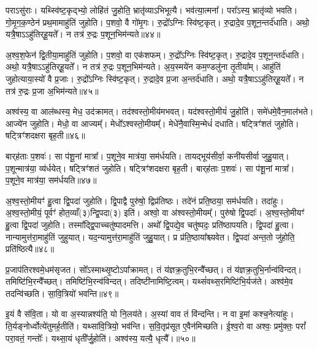 पराऽसु॑राः।
यथ्स्वि॑ष्ट॒कृद्भ्यो॒ लोहि॑तं जु॒होति॒ भ्रातृ॑व्याऽभिभूत्यै।
भव॑त्या॒त्मना᳚।
परा᳚ऽस्य॒ भ्रातृ॑व्यो भवति।
गो॒मृ॒ग॒क॒ण्ठेन॑ प्रथ॒मामाहु॑तिं जुहोति।
प॒शवो॒ वै गो॑मृ॒गः।
रु॒द्रो᳚\-ऽग्निः स्वि॑ष्ट॒कृत्।
रु॒द्रादे॒व प॒शून॒न्तर्द॑धाति।
अथो॒ यत्रै॒षा\-ऽऽहु॑तिर्‌\mbox{}हू॒यते᳚।
न तत्र॑ रु॒द्रः प॒शून॒भिम॑न्यते॥४४॥

अ॒श्व॒श॒फेन॑ द्वि॒तीया॒माहु॑तिं जुहोति।
प॒शवो॒ वा एक॑शफम्।
रु॒द्रो᳚\-ऽग्निः स्वि॑ष्ट॒कृत्।
रु॒द्रादे॒व प॒शून॒न्तर्द॑धाति।
अथो॒ यत्रै॒षा\-ऽऽहु॑तिर्‌\mbox{}हू॒यते᳚।
न तत्र॑ रु॒द्रः प॒शून॒भिम॑न्यते।
अ॒य॒स्मये॑न कम॒ण्डलु॑ना तृ॒तीया᳚म्।
आहु॑तिं जुहोत्याया॒स्यो॑ वै प्र॒जाः।
रु॒द्रो᳚\-ऽग्निः स्वि॑ष्ट॒कृत्।
रु॒द्रादे॒व प्र॒जा अ॒न्तर्द॑धाति।
अथो॒ यत्रै॒षा\-ऽऽहु॑तिर्‌\mbox{}हू॒यते᳚।
न तत्र॑ रु॒द्रः प्र॒जा अ॒भिम॑न्यते॥४५॥\anuvakamend[द॒धा॒त्यभ॑वन्मन्यते प्र॒जा अ॒न्तर्द॑धाति॒ द्वे च॑ ]

अश्व॑स्य॒ वा आल॑ब्धस्य॒ मेध॒ उद॑क्रामत्।
तद॑श्वस्तो॒मीय॑\-मभवत्।
यद॑श्वस्तो॒मीयं॑ जु॒होति॑।
समे॑धमे॒वैन॒माल॑भते।
आज्ये॑न जुहोति।
मेधो॒ वा आज्यम्᳚।
मेधो᳚\-ऽश्वस्तो॒मीयम्᳚।
मेधे॑नै॒वास्मि॒न्मेधं॑ दधाति।
षट्त्रिꣳ॑शतं जुहोति।
षट्त्रिꣳ॑शदक्षरा बृह॒ती॥४६॥

बार्‌\mbox{}ह॑ताः प॒शवः॑।
सा प॑शू॒नां मात्रा᳚।
प॒शूने॒व मात्र॑या॒ सम॑र्धयति।
तायद्भूय॑सीर्वा॒ कनी॑यसीर्वा जुहु॒यात्।
प॒शून्मात्र॑या॒ व्य॑र्धयेत्।
षट्त्रिꣳ॑शतं जुहोति।
षट्त्रिꣳ॑शदक्षरा बृह॒ती।
बार्‌\mbox{}ह॑ताः प॒शवः॑।
सा प॑शू॒नां मात्रा᳚।
प॒शूने॒व मात्र॑या॒ सम॑र्धयति॥४७॥

अ॒श्व॒स्तो॒मीयꣳ॑ हु॒त्वा द्वि॒पदा॑ जुहोति।
द्वि॒पाद्वै पुरु॑षो॒ द्विप्र॑तिष्ठः।
तदे॑नं प्रति॒ष्ठया॒ सम॑र्धयति।
तदा॑हुः।
अ॒श्व॒स्तो॒मीयं॒ पूर्वꣳ॑ होत॒व्याँ(३)न्द्वि॒पदा(३) इति॑।
अश्वो॒ वा अ॑श्वस्तो॒मीयम्᳚।
पुरु॑षो द्वि॒पदाः᳚।
अ॒श्व॒स्तो॒मीयꣳ॑ हु॒त्वा द्वि॒पदा॑ जुहोति।
तस्मा᳚द्द्वि॒पाच्चतु॑ष्पादमत्ति।
अथो᳚ द्वि॒पद्ये॒व चतु॑ष्पदः॒ प्रति॑\-ष्ठापयति।
द्वि॒पदा॑ हु॒त्वा।
नान्यामुत्त॑रा॒माहु॑तिं जुहुयात्।
यद॒न्यामुत्त॑रा॒माहु॑तिं जुहु॒यात्।
प्र प्र॑ति॒ष्ठाया᳚श्च्यवेत।
द्वि॒पदा॑ अन्त॒तो जु॑होति॒ प्रति॑\-ष्ठित्यै॥४८॥

प्र॒जाप॑तिरश्वमे॒धम॑सृजत।
सो᳚ऽस्माथ्सृ॒ष्टो\-ऽपा᳚क्रामत्।
तं य॑ज्ञक्र॒तुभि॒रन्वै᳚च्छत्।
तं य॑ज्ञक्र॒तुभि॒र्नान्व॑विन्दत्।
तमिष्टि॑भि॒रन्वै᳚च्छत्।
तमिष्टि॑भि॒रन्व॑विन्दत्।
तदिष्टी॑नामिष्टि॒\-त्वम्।
यथ्सं॑वथ्स॒रमिष्टि॑भि॒र्यज॑ते।
अश्व॑मे॒व तदन्वि॑च्छति।
सा॒वि॒त्रियो॑ भवन्ति॥४९॥

इ॒यं वै स॑वि॒ता।
यो वा अ॒स्यान्नश्य॑ति॒ यो नि॒लय॑ते।
अ॒स्यां वाव तं वि॑न्दन्ति।
न वा इ॒मां कश्च॒नेत्या॑हुः।
ति॒र्यङ्नोर्ध्वोत्ये॑तुमर्ह॒तीति॑।
यथ्सा॑वि॒त्रियो॒ भव॑न्ति।
स॒वि॒तृ\-प्र॑सूत ए॒वैन॑मिच्छति।
ई॒श्व॒रो वा अश्वः॒ प्रमु॑क्तः॒ परां᳚ परा॒वतं॒ गन्तोः᳚।
यथ्सा॒यं धृती᳚र्जु॒होति॑।
अश्व॑स्य॒ यत्यै॒ धृत्यै᳚।॥५०॥

